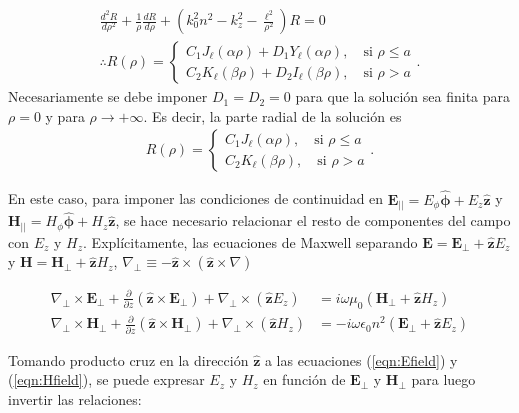 \begin{align}
	\frac{d^2 R}{d\rho^2} + \frac{1}{\rho}\frac{dR}{d\rho} + \left( k_0^2n^2 - k_z^2 -\frac{\ell^2}{\rho^2}\right)R  = 0
	\nonumber
	\\
	\therefore R(\rho) = 
	\left\{
	\begin{matrix}	
	C_1 J_\ell (\alpha\rho) + D_1 Y_\ell (\alpha\rho), \quad \text{si } \rho \le a  
	\\
	C_2 K_\ell (\beta\rho) + D_2 I_\ell (\beta\rho), \quad \text{si } \rho > a  
	\end{matrix}
	\right.
	. \nonumber
\end{align}
Necesariamente se debe imponer $D_1 = D_2 = 0$ para que la solución sea finita para $\rho = 0$ y para $\rho \to +\infty$. Es decir, la parte radial de la solución es
\begin{align*}
 R(\rho) = 
	\left\{
	\begin{matrix}	
	C_1 J_\ell (\alpha\rho), \quad \text{si } \rho \le a  
	\\
	C_2 K_\ell (\beta\rho), \quad \text{si } \rho > a  
	\end{matrix}
	\right.
	. \nonumber
\end{align*}

En este caso, para imponer las condiciones de continuidad en $\textbf{E}_{||} = E_\phi \boldsymbol{\hat{\phi}} + E_z \hat{\textbf{z}}$ y $\textbf{H}_{||}= H_\phi \hat{\boldsymbol{\phi}} + H_z \hat{\textbf{z}}$, se hace necesario relacionar el resto de componentes del campo con $E_z$ y $H_z$. Explícitamente, las ecuaciones de Maxwell separando $\textbf{E}=\textbf{E}_\perp +\hat{\textbf{z}} E_z$ y $\textbf{H}=\textbf{H}_\perp +\hat{\textbf{z}} H_z$, $\nabla_\perp \equiv - \hat{\textbf{z}}\times (\hat{\textbf{z}}\times\nabla)   $

\begin{align}
	\nabla_\perp \times  \textbf{E}_\perp + \frac{\partial}{\partial z} (\hat{\textbf{z}} \times \textbf{E}_\perp) + \nabla_\perp \times (\hat{\textbf{z}} E_z) &= i\omega\mu_0(\textbf{H}_\perp +\hat{\textbf{z}} H_z)
	\label{eqn:Efield}
	\\
	\nabla_\perp \times  \textbf{H}_\perp + \frac{\partial}{\partial z} (\hat{\textbf{z}} \times \textbf{H}_\perp) + \nabla_\perp \times (\hat{\textbf{z}} H_z) &= -i\omega \epsilon_0 n^2 (\textbf{E}_\perp +\hat{\textbf{z}} E_z)
	\label{eqn:Hfield}
\end{align}

Tomando producto cruz en la dirección $\hat{\textbf{z}}$ a las ecuaciones (\ref{eqn:Efield}) y (\ref{eqn:Hfield}), se puede expresar $E_z$ y $H_z$ en función de $\textbf{E}_\perp$ y $\textbf{H}_\perp$ para luego invertir las relaciones: 


